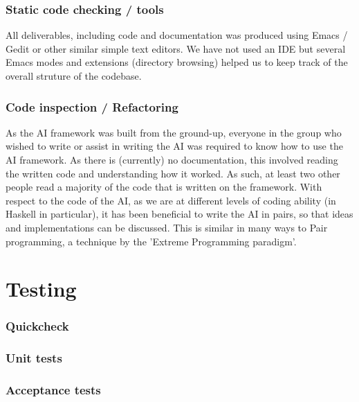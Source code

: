\documentclass[11pt]{article}
\begin{document}
\subsubsection{Static code checking / tools}
All deliverables, including code and documentation was produced using Emacs /
Gedit or other similar simple text editors. We have not used an IDE but several
Emacs modes and extensions (directory browsing) helped us to keep track of the
overall struture of the codebase. 

\subsubsection{Code inspection / Refactoring}
As the AI framework was built from the ground-up, everyone in the group who
wished to write or assist in writing the AI was required to know how to use the
AI framework. As there is (currently) no documentation, this involved reading
the written code and understanding how it worked. As such, at least two other 
people read a majority of the code that is written on the framework. With 
respect to the code of the AI, as we are at different levels of coding ability 
(in Haskell in particular), it has been beneficial to write the AI in pairs, so
that ideas and implementations can be discussed. This is similar in many ways to
Pair programming, a technique by the 'Extreme Programming paradigm'.

\section{Testing}

\subsubsection{Quickcheck}

\subsubsection{Unit tests}

\subsubsection{Acceptance tests}
\end{document}
